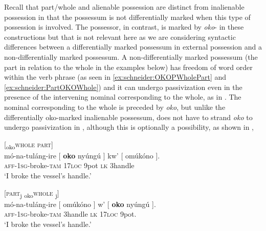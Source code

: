 \documentclass[output=paper]{langscibook}
\begin{document}
Recall that part/whole and alienable possession are distinct from inalienable possession in that the possessum is not differentially marked when this type of possession is involved. The possessor, in contrast, is marked by \textit{oko}- in these constructions but that is not relevant here as we are considering syntactic differences between a differentially marked possessum in external possession and a non-differentially marked possessum. A non-differentially marked possessum (the part in relation to the whole in the examples below) has freedom of word order within the verb phrase (as seen in \ref{ex:schneider:OKOPWholePart} and \ref{ex:schneider:PartOKOWhole}) and it can undergo passivization even in the presence of the intervening nominal corresponding to the whole, as in . The nominal corresponding to the whole is preceded by \textit{oko}, but unlike the differentially oko-marked inalienable possessum, does not have to strand \textit{oko} to undergo passivization in , although this is optionally a possibility, as shown in , 

\ea \label{ex:schneider:PartWhole}
\begin{xlist}

\ex \label{ex:schneider:OKOPWholePart}
[\textsubscript{oko}\textsc{whole {  } part}] \\
\gll m\'o-na-tuláng-ire [ \textbf{\textbf{oko}} nyúngú ] kw' [ omúk\'ono ].  \\
\textsc{aff-1sg}-broke-\textsc{tam} {} \textsc{17loc} 9pot {} \textsc{lk} {} 3handle {} \\
\glt `I broke the vessel's handle.'

\ex \label{ex:schneider:PartOKOWhole}
[\textsc{part}\textsubscript{j} {  } \textsubscript{oko}\textsc{whole} {  } \underline{\hspace{0.5cm}}\textsubscript{j}] \\
\gll m\'o-na-tuláng-ire [ omúk\'ono ] w' [ \textbf{oko} nyúngú ].  \\
\textsc{aff-1sg}-broke-\textsc{tam} {} 3handle {} \textsc{lk} {} \textsc{17loc} 9pot. {}  \\
\glt `I broke the vessel's handle.'

\end{xlist}
\end{document}
